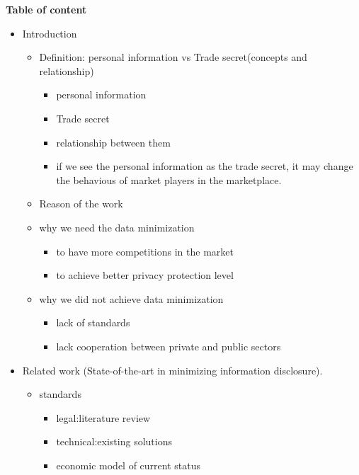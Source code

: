 \documentclass[runningheads,a4paper]{llncs}
\begin{document}
\textbf{Table of content}
\begin{itemize}
    \item Introduction
            \begin{itemize}
            \item Definition: personal information vs Trade secret(concepts and relationship)
                \begin{itemize}
                    \item personal information
                    \item Trade secret
                    \item relationship between them
                    \item if we see the personal information as the trade secret, it may change the behavious of market players in the marketplace.
                \end{itemize}
    \item Reason of the work
            \item why we need the data minimization
                \begin{itemize}
                    \item to have more competitions in the market
                    \item to achieve better privacy protection level
                \end{itemize}
                \item why we did not achieve data minimization
                \begin{itemize}
                    \item lack of standards
                    \item lack cooperation between private and public sectors
                \end{itemize}
        \end{itemize}
    \item Related work (State-of-the-art in minimizing information disclosure).
        \begin{itemize}
            \item standards
             \begin{itemize}
                \item legal:literature review
                \item technical:existing solutions
                \item economic model of current status
                \end{itemize}

\end{itemize}
\end{itemize}
\end{document}
